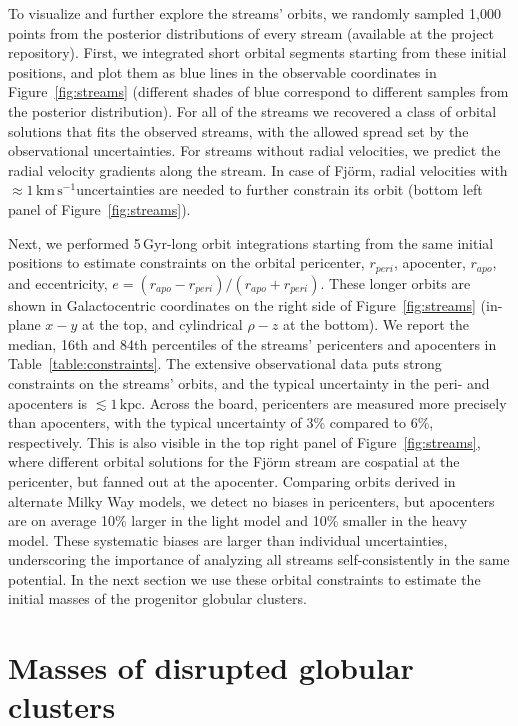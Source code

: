 \documentclass[twocolumn]{aastex63}
\newcommand{\kpc}{\ensuremath{\textrm{kpc}}}
\newcommand{\kms}{\ensuremath{\textrm{km}\,\textrm{s}^{-1}}}
\begin{document}
To visualize and further explore the streams' orbits, we randomly sampled 1,000 points from the posterior distributions of every stream (available at the project repository).
First, we integrated short orbital segments starting from these initial positions, and plot them as blue lines in the observable coordinates in Figure~\ref{fig:streams} (different shades of blue correspond to different samples from the posterior distribution).
For all of the streams we recovered a class of orbital solutions that fits the observed streams, with the allowed spread set by the observational uncertainties.
For streams without radial velocities, we predict the radial velocity gradients along the stream.
In case of Fj\" orm, radial velocities with $\approx1$\,\kms uncertainties are needed to further constrain its orbit (bottom left panel of Figure~\ref{fig:streams}).

Next, we performed 5\,Gyr-long orbit integrations starting from the same initial positions to estimate constraints on the orbital pericenter, $r_{peri}$, apocenter, $r_{apo}$, and eccentricity, $e=(r_{apo} - r_{peri})/(r_{apo} + r_{peri})$.
These longer orbits are shown in Galactocentric coordinates on the right side of Figure~\ref{fig:streams} (in-plane $x-y$ at the top, and cylindrical $\rho-z$ at the bottom).
We report the median, 16th and 84th percentiles of the streams' pericenters and apocenters in Table~\ref{table:constraints}.
The extensive observational data puts strong constraints on the streams' orbits, and the typical uncertainty in the peri- and apocenters is $\lesssim1\,\kpc$.
Across the board, pericenters are measured more precisely than apocenters, with the typical uncertainty of 3\% compared to 6\%, respectively.
This is also visible in the top right panel of Figure~\ref{fig:streams}, where different orbital solutions for the  Fj\" orm stream are cospatial at the pericenter, but fanned out at the apocenter.
Comparing orbits derived in alternate Milky Way models, we detect no biases in pericenters, but apocenters are on average 10\% larger in the light model and 10\% smaller in the heavy model.
These systematic biases are larger than individual uncertainties, underscoring the importance of analyzing all streams self-consistently in the same potential.
In the next section we use these orbital constraints to estimate the initial masses of the progenitor globular clusters.

\section{Masses of disrupted globular clusters}
\label{sec:disrupted}
\end{document}
